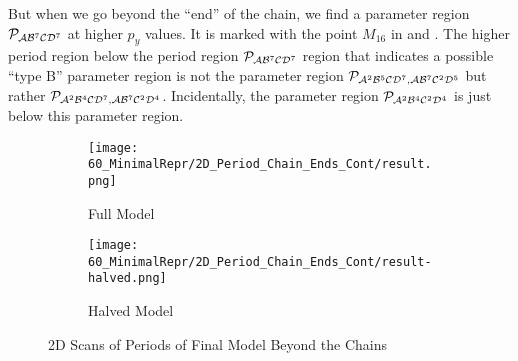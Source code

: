 But when we go beyond the ``end'' of the chain, we find a parameter region $\mathcal{P}_{\mathcal{A}\mathcal{B}^7\mathcal{C}\mathcal{D}^7}$ at higher $p_y$ values.
It is marked with the point $M_{16}$ in  and .
The higher period region below the period region $\mathcal{P}_{\mathcal{A}\mathcal{B}^7\mathcal{C}\mathcal{D}^7}$ region that indicates a possible ``type B'' parameter region is not the parameter region $\mathcal{P}_{\mathcal{A}^2\mathcal{B}^5\mathcal{C}\mathcal{D}^7, \mathcal{A}\mathcal{B}^7\mathcal{C}^2\mathcal{D}^5}$ but rather $\mathcal{P}_{\mathcal{A}^2\mathcal{B}^4\mathcal{C}\mathcal{D}^7, \mathcal{A}\mathcal{B}^7\mathcal{C}^2\mathcal{D}^4}$.
Incidentally, the parameter region $\mathcal{P}_{\mathcal{A}^2\mathcal{B}^4\mathcal{C}^2\mathcal{D}^4}$ is just below this parameter region.

\begin{figure}
    \centering
    \begin{subfigure}{0.4\textwidth}
        \centering
        \texttt{[image: 60\_MinimalRepr/2D\_Period\_Chain\_Ends\_Cont/result.png]}
        \caption{Full Model}
        \label{fig:final.period.beyond.full}
    \end{subfigure}
    \begin{subfigure}{0.4\textwidth}
        \centering
        \texttt{[image: 60\_MinimalRepr/2D\_Period\_Chain\_Ends\_Cont/result-halved.png]}
        \caption{Halved Model}
        \label{fig:final.period.beyond.halved}
    \end{subfigure}
    \caption{2D Scans of Periods of Final Model Beyond the Chains}
\end{figure}
